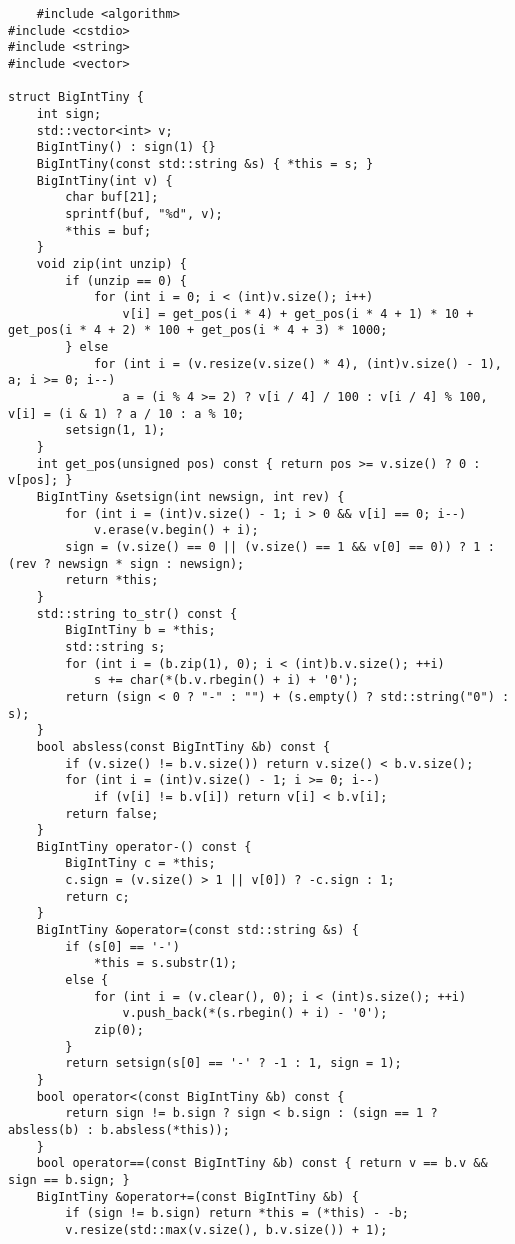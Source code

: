 \documentclass[UTF8]{ctexart}
\begin{document}
\begin{lstlisting}
    #include <algorithm>
#include <cstdio>
#include <string>
#include <vector>

struct BigIntTiny {
    int sign;
    std::vector<int> v;
    BigIntTiny() : sign(1) {}
    BigIntTiny(const std::string &s) { *this = s; }
    BigIntTiny(int v) {
        char buf[21];
        sprintf(buf, "%d", v);
        *this = buf;
    }
    void zip(int unzip) {
        if (unzip == 0) {
            for (int i = 0; i < (int)v.size(); i++)
                v[i] = get_pos(i * 4) + get_pos(i * 4 + 1) * 10 + get_pos(i * 4 + 2) * 100 + get_pos(i * 4 + 3) * 1000;
        } else
            for (int i = (v.resize(v.size() * 4), (int)v.size() - 1), a; i >= 0; i--)
                a = (i % 4 >= 2) ? v[i / 4] / 100 : v[i / 4] % 100, v[i] = (i & 1) ? a / 10 : a % 10;
        setsign(1, 1);
    }
    int get_pos(unsigned pos) const { return pos >= v.size() ? 0 : v[pos]; }
    BigIntTiny &setsign(int newsign, int rev) {
        for (int i = (int)v.size() - 1; i > 0 && v[i] == 0; i--)
            v.erase(v.begin() + i);
        sign = (v.size() == 0 || (v.size() == 1 && v[0] == 0)) ? 1 : (rev ? newsign * sign : newsign);
        return *this;
    }
    std::string to_str() const {
        BigIntTiny b = *this;
        std::string s;
        for (int i = (b.zip(1), 0); i < (int)b.v.size(); ++i)
            s += char(*(b.v.rbegin() + i) + '0');
        return (sign < 0 ? "-" : "") + (s.empty() ? std::string("0") : s);
    }
    bool absless(const BigIntTiny &b) const {
        if (v.size() != b.v.size()) return v.size() < b.v.size();
        for (int i = (int)v.size() - 1; i >= 0; i--)
            if (v[i] != b.v[i]) return v[i] < b.v[i];
        return false;
    }
    BigIntTiny operator-() const {
        BigIntTiny c = *this;
        c.sign = (v.size() > 1 || v[0]) ? -c.sign : 1;
        return c;
    }
    BigIntTiny &operator=(const std::string &s) {
        if (s[0] == '-')
            *this = s.substr(1);
        else {
            for (int i = (v.clear(), 0); i < (int)s.size(); ++i)
                v.push_back(*(s.rbegin() + i) - '0');
            zip(0);
        }
        return setsign(s[0] == '-' ? -1 : 1, sign = 1);
    }
    bool operator<(const BigIntTiny &b) const {
        return sign != b.sign ? sign < b.sign : (sign == 1 ? absless(b) : b.absless(*this));
    }
    bool operator==(const BigIntTiny &b) const { return v == b.v && sign == b.sign; }
    BigIntTiny &operator+=(const BigIntTiny &b) {
        if (sign != b.sign) return *this = (*this) - -b;
        v.resize(std::max(v.size(), b.v.size()) + 1);

\end{lstlisting}
\end{document}
